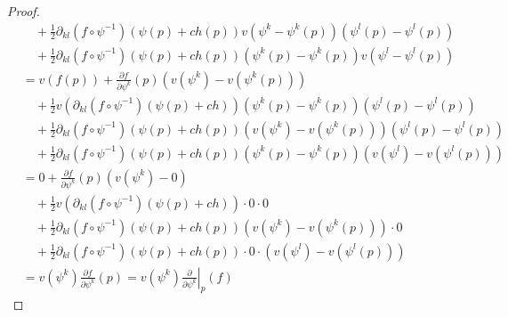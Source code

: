 \documentclass[dvipdfmx]{jsarticle}
\begin{document}
\begin{proof}
\begin{align*}
    &\quad +\frac{1}{2}\partial_{kl} \left(f\circ \psi^{-1}\right) \left(\psi\left(p\right) +ch\left(p\right) \right) v\left(\psi^k-\psi^k  \left(p\right)\right) \left(\psi^l \left(p\right) -\psi^l \left(p\right)\right)\\
    &\quad +\frac{1}{2}\partial_{kl} \left(f\circ \psi^{-1}\right) \left(\psi\left(p\right) +ch\left(p\right) \right) \left(\psi^k \left(p\right) -\psi^k  \left(p\right)\right) v\left(\psi^l -\psi^l \left(p\right)\right) \\
    &=v\left(f\left(p\right) \right)+\frac{\partial f}{\partial \psi^k } \left(p\right) \left(v\left(\psi^k \right)-v\left(\psi^k \left(p\right) \right)\right) \\
    &\quad +\frac{1}{2}v\left(\partial_{kl} \left(f\circ \psi^{-1}\right) \left(\psi\left(p\right) +ch \right) \right) \left(\psi^k \left(p\right) -\psi^k  \left(p\right)\right) \left(\psi^l \left(p\right) -\psi^l \left(p\right)\right)\\
    &\quad +\frac{1}{2}\partial_{kl} \left(f\circ \psi^{-1}\right) \left(\psi\left(p\right) +ch\left(p\right) \right) \left(v\left(\psi^k \right)-v\left(\psi^k \left(p\right) \right)\right)  \left(\psi^l \left(p\right) -\psi^l \left(p\right)\right)\\
    &\quad +\frac{1}{2}\partial_{kl} \left(f\circ \psi^{-1}\right) \left(\psi\left(p\right) +ch\left(p\right) \right) \left(\psi^k \left(p\right) -\psi^k  \left(p\right)\right) \left(v\left(\psi^l \right)-v\left(\psi^l \left(p\right) \right)\right) \\
    &=0+\frac{\partial f}{\partial \psi^k } \left(p\right) \left(v\left(\psi^k \right)-0\right) \\
    &\quad +\frac{1}{2}v\left(\partial_{kl} \left(f\circ \psi^{-1}\right) \left(\psi\left(p\right) +ch \right) \right) \cdot 0\cdot 0\\
    &\quad +\frac{1}{2}\partial_{kl} \left(f\circ \psi^{-1}\right) \left(\psi\left(p\right) +ch\left(p\right) \right) \left(v\left(\psi^k \right)-v\left(\psi^k \left(p\right) \right)\right) \cdot 0\\
    &\quad +\frac{1}{2}\partial_{kl} \left(f\circ \psi^{-1}\right) \left(\psi\left(p\right) +ch\left(p\right) \right) \cdot 0 \cdot \left(v\left(\psi^l \right)-v\left(\psi^l \left(p\right) \right)\right) \\
    &=v\left(\psi^k \right) \frac{\partial f}{\partial \psi^k } \left(p\right) =v\left(\psi^k \right) \left. \frac{\partial}{\partial \psi^k } \right|_p \left(f\right)
  \end{align*}

\end{proof}
\end{document}
